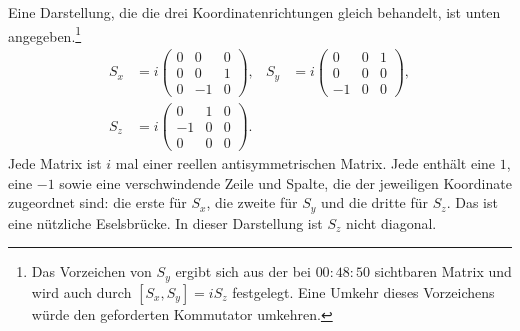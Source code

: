 Eine Darstellung, die die drei Koordinatenrichtungen gleich behandelt, ist unten angegeben.\footnote{Das Vorzeichen von \(S_y\) ergibt sich aus der bei \(00{:}48{:}50\) sichtbaren Matrix und wird auch durch \([S_x,S_y]=iS_z\) festgelegt. Eine Umkehr dieses Vorzeichens würde den geforderten Kommutator umkehren.}
\begin{equation}
\begin{aligned}
S_x
&=
i
\begin{pmatrix}
0&0&0\\
0&0&1\\
0&-1&0
\end{pmatrix},
&
S_y
&=
i
\begin{pmatrix}
0&0&1\\
0&0&0\\
-1&0&0
\end{pmatrix},\\
S_z
&=
i
\begin{pmatrix}
0&1&0\\
-1&0&0\\
0&0&0
\end{pmatrix}.
\end{aligned}
\end{equation}
Jede Matrix ist \(i\) mal einer reellen antisymmetrischen Matrix. Jede enthält eine \(1\), eine \(-1\) sowie eine verschwindende Zeile und Spalte, die der jeweiligen Koordinate zugeordnet sind: die erste für \(S_x\), die zweite für \(S_y\) und die dritte für \(S_z\). Das ist eine nützliche Eselsbrücke. In dieser Darstellung ist \(S_z\) nicht diagonal.

